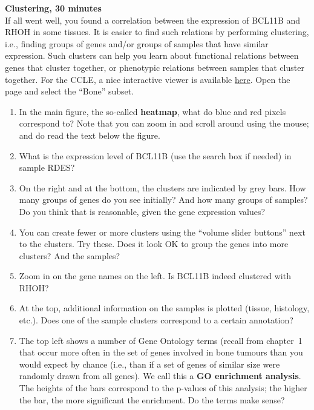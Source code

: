 \begin{framed}
\textbf{Clustering, 30 minutes}\\
If all went well, you found a correlation between the expression of BCL11B and RHOH in some tissues.
It is easier to find such relations by performing clustering, i.e., finding groups of genes and/or groups of samples that have similar expression.
Such clusters can help you learn about functional relations between genes that cluster together, or phenotypic relations between samples that cluster together.
For the CCLE, a nice interactive viewer is available \href{https://maayanlab.github.io/CCLE\_Clustergrammer/}{here}.
Open the page and select the ``Bone'' subset.

\begin{enumerate}
\item In the main figure, the so-called \textbf{heatmap}, what do blue and red pixels correspond to? Note that you can zoom in and scroll around using the mouse; and do read the text below the figure.
\item What is the expression level of BCL11B (use the search box if needed) in sample RDES?
\item On the right and at the bottom, the clusters are indicated by grey bars. How many groups of genes do you see initially? And how many groups of samples? Do you think that is reasonable, given the gene expression values?
\item You can create fewer or more clusters using the ``volume slider buttons'' next to the clusters. Try these. Does it look OK to group the genes into more clusters? And the samples?
\item Zoom in on the gene names on the left. Is BCL11B indeed clustered with RHOH?
\item At the top, additional information on the samples is plotted (tissue, histology, etc.). Does one of the sample clusters correspond to a certain annotation?
\item The top left shows a number of Gene Ontology terms (recall from chapter~1 that occur more often in the set of genes involved in bone tumours than you would expect by chance (i.e., than if a set of genes of similar size were randomly drawn from all genes). We call this a \textbf{GO enrichment analysis}. The heights of the bars correspond to the p-values of this analysis; the higher the bar, the more significant the enrichment. Do the terms make sense?
\end{enumerate}
\end{framed}

